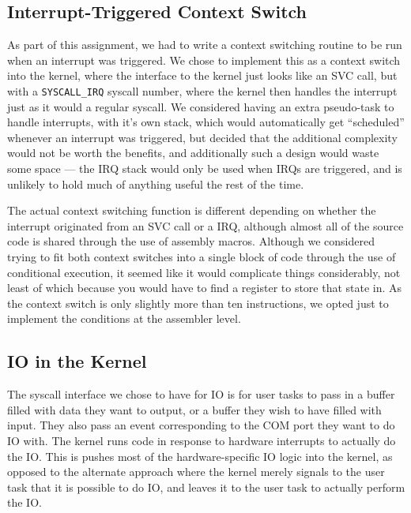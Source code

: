 \documentclass[titlepage]{article}
\begin{document}
\subsection{Interrupt-Triggered Context Switch}
As part of this assignment, we had to write a context switching
routine to be run when an interrupt was triggered.
We chose to implement this as a context switch into the kernel, where the interface to the kernel just looks
like an SVC call, but with a \texttt{SYSCALL\_IRQ} syscall number, where the kernel then
handles the interrupt just as it would a regular syscall. We considered having
an extra pseudo-task to handle interrupts, with it's own stack, which would
automatically get ``scheduled'' whenever an interrupt was triggered, but decided
that the additional complexity would not be worth the benefits, and additionally
such a design would waste some space --- the IRQ stack would only be used when
IRQs are triggered, and is unlikely to hold much of anything useful the rest
of the time.

The actual context switching function is different depending on whether the
interrupt originated from an SVC call or a IRQ, although almost all of the
source code is shared through the use of assembly macros. Although we considered
trying to fit both context switches into a single block of code through the use
of conditional execution, it seemed like it would complicate things
considerably, not least of which because you would have to find a register to
store that state in. As the context switch is only slightly more than ten
instructions, we opted just to implement the conditions at the assembler level.



\subsection{IO in the Kernel}
The syscall interface we chose to have for IO is for user tasks to pass in a buffer
filled with data they want to output, or a buffer they wish to have filled with input.
They also pass an event corresponding to the COM port they want to do IO with.
The kernel runs code in response to hardware interrupts to actually do the IO.\@
This is pushes most of the hardware-specific IO logic into the kernel, as opposed to
the alternate approach where the kernel merely signals to the user task that it is possible
to do IO, and leaves it to the user task to actually perform the IO.
\end{document}
